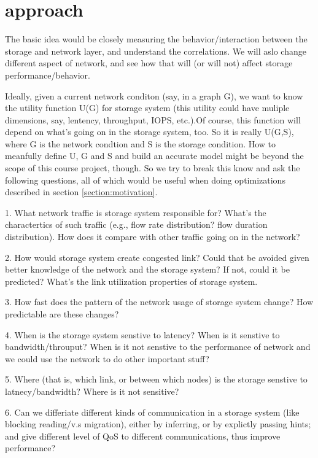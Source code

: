 \section{approach}
\label{sec:approach}
The basic idea would be closely measuring the behavior/interaction between the storage and network layer, and understand the correlations. We will aslo change different aspect of network, and see how that will (or will not) affect storage performance/behavior.

Ideally, given a current network conditon (say, in a graph G), we want to know the utility function U(G) for storage system (this utility could have muliple dimensions, say, lentency, throughput, IOPS, etc.).Of course, this function will depend on what's going on in the storage system, too. So it is really U(G,S), where G is the network condtion and S is the storage  condition. How to meanfully define U, G and S and build an accurate model might be beyond the scope of this course project, though. So we try to break this know and ask the following questions, all of which would be useful when doing optimizations described in section \ref{section:motivation}.

1. What network traffic is storage system responsible for? What's the charactertics of such traffic (e.g., flow rate distribution? flow duration distribution). How does it compare with other traffic going on in the network?

2. How would storage system create congested link? Could that be avoided given better knowledge of the network and the storage system? If not, could it be predicted? What's the link utilization properties of storage system.

3. How fast does the pattern of the network usage of storage system change? How predictable are these changes?

4. When is the storage system senstive to latency? When is it senstive to bandwidth/throuput? When is it not senstive to the performance of network and we could use the network to do other important stuff? 

5. Where (that is, which link, or between which nodes) is the storage senstive to latnecy/bandwidth? Where is it not sensitive?

6. Can we differiate different kinds of communication in a storage system (like blocking reading/v.s migration), either by inferring, or by explictly passing hints; and give different level of QoS to different communications, thus improve performance?

